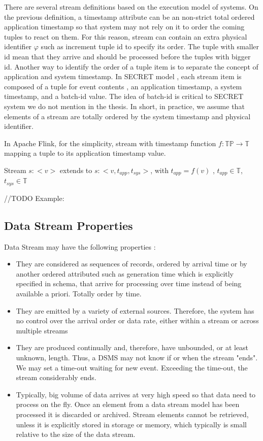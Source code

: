 There are several stream definitions based on the execution model of systems. On the previous definition, a timestamp attribute can be an non-strict total ordered application timestamp so that system may not rely on it to order the coming tuples to react on them. For this reason, stream can contain an extra physical identifier  $\varphi$ \citep{Petit:2010} such as increment tuple id to specify its order. The tuple with smaller id mean that they arrive and should be processed before the tuples with bigger id. Another way to identify the order of a tuple item is to separate the concept of application and system timestamp. In SECRET model \citep{Botan:2010}, each stream item is composed of a tuple for event contents , an application timestamp, a system timestamp, and a batch-id value. The idea of batch-id is critical to SECRET system we do not mention in the thesis.
In short, in practice, we assume that elements of a stream are totally ordered by the system timestamp and physical identifier.

In Apache Flink, for the simplicity, stream with timestamp function $f: \mathbb{TP} \rightarrow \mathbb{T}$ mapping a tuple to its application timestamp value.

Stream $s:<v>$ extends to $s:<v, t_{app}, t_{sys}>$, with $t_{app} = f(v)$ , $t_{app} \in \mathbb{T}$, $t_{sys} \in \mathbb{T}$

//TODO Example: 

 
\subsection*{Data Stream Properties} 
Data Stream may have the following properties \citep{Golab:2010}:
\begin{itemize}
	\item They are considered as sequences of records, ordered by arrival time or by another ordered attributed such as generation time which is explicitly specified in schema, that arrive for processing over time instead of being available a priori. Totally order by time. 
	\item They are emitted by a variety of external sources. Therefore, the system has no control over the arrival order or data rate, either within a stream or across multiple streams
	\item They are produced continually and, therefore, have unbounded, or at least unknown, length. Thus, a DSMS may not know if or when the stream "ends". We may set a time-out waiting for new event. Exceeding the time-out, the stream considerably ends. 
	\item Typically, big volume of data arrives at very high speed so that data need to process on the fly. Once an element from a data stream model has been processed it is discarded or archived. Stream elements cannot be retrieved, unless it is explicitly stored in storage or memory, which typically is small relative to the size of the data stream. \citep{Babcock:2002}
	
\end{itemize}


